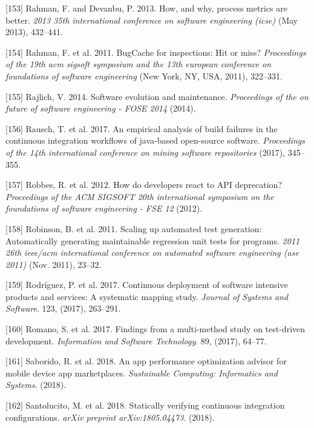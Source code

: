 \documentclass[]{book}
\begin{document}
\hypertarget{ref-Rahman2013}{}
{[}153{]} Rahman, F. and Devanbu, P. 2013. How, and why, process metrics
are better. \emph{2013 35th international conference on software
engineering (icse)} (May 2013), 432--441.

\hypertarget{ref-rahman2011}{}
{[}154{]} Rahman, F. et al. 2011. BugCache for inspections: Hit or miss?
\emph{Proceedings of the 19th acm sigsoft symposium and the 13th
european conference on foundations of software engineering} (New York,
NY, USA, 2011), 322--331.

\hypertarget{ref-Rajlich2014}{}
{[}155{]} Rajlich, V. 2014. Software evolution and maintenance.
\emph{Proceedings of the on future of software engineering - FOSE 2014}
(2014).

\hypertarget{ref-rausch2017empirical}{}
{[}156{]} Rausch, T. et al. 2017. An empirical analysis of build
failures in the continuous integration workflows of java-based
open-source software. \emph{Proceedings of the 14th international
conference on mining software repositories} (2017), 345--355.

\hypertarget{ref-Robbes2012}{}
{[}157{]} Robbes, R. et al. 2012. How do developers react to API
deprecation? \emph{Proceedings of the ACM SIGSOFT 20th international
symposium on the foundations of software engineering - FSE 12} (2012).

\hypertarget{ref-robinson2011}{}
{[}158{]} Robinson, B. et al. 2011. Scaling up automated test
generation: Automatically generating maintainable regression unit tests
for programs. \emph{2011 26th ieee/acm international conference on
automated software engineering (ase 2011)} (Nov. 2011), 23--32.

\hypertarget{ref-rodriguez2017a}{}
{[}159{]} Rodríguez, P. et al. 2017. Continuous deployment of software
intensive products and services: A systematic mapping study.
\emph{Journal of Systems and Software}. 123, (2017), 263--291.

\hypertarget{ref-ROMANO201764}{}
{[}160{]} Romano, S. et al. 2017. Findings from a multi-method study on
test-driven development. \emph{Information and Software Technology}. 89,
(2017), 64--77.

\hypertarget{ref-SKHA2018}{}
{[}161{]} Saborido, R. et al. 2018. An app performance optimization
advisor for mobile device app marketplaces. \emph{Sustainable Computing:
Informatics and Systems}. (2018).

\hypertarget{ref-santolucito2018statically}{}
{[}162{]} Santolucito, M. et al. 2018. Statically verifying continuous
integration configurations. \emph{arXiv preprint arXiv:1805.04473}.
(2018).
\end{document}
